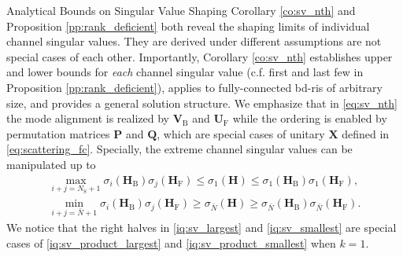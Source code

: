 \documentclass[journal]{IEEEtran}
\begin{document}
\begin{section}{Analytical Bounds on Singular Value Shaping}
		Corollary \ref{co:sv_nth} and Proposition \ref{pp:rank_deficient} both reveal the shaping limits of individual channel singular values.
		They are derived under different assumptions are not special cases of each other.
		Importantly, Corollary \ref{co:sv_nth} establishes upper and lower bounds for \emph{each} channel singular value (c.f. first and last few in Proposition \ref{pp:rank_deficient}), applies to fully-connected \gls{bd}-\gls{ris} of arbitrary size, and provides a general solution structure.
		We emphasize that in \eqref{eq:sv_nth} the mode alignment is realized by $\mathbf{V}_\mathrm{B}$ and $\mathbf{U}_\mathrm{F}$ while the ordering is enabled by permutation matrices $\mathbf{P}$ and $\mathbf{Q}$, which are special cases of unitary $\mathbf{X}$ defined in \eqref{eq:scattering_fc}.
		Specially, the extreme channel singular values can be manipulated up to
		\begin{subequations}
			\label{iq:sv_extreme}
			\begin{gather}
				\max_{i+j=N_\mathrm{S}+1} \sigma_i(\mathbf{H}_\mathrm{B}) \sigma_j(\mathbf{H}_\mathrm{F}) {\le} \sigma_1(\mathbf{H}) {\le} \sigma_1(\mathbf{H}_\mathrm{B}) \sigma_1(\mathbf{H}_\mathrm{F}), \label{iq:sv_largest} \\
				\min_{i+j=\bar{N}+1} \sigma_i(\mathbf{H}_\mathrm{B}) \sigma_j(\mathbf{H}_\mathrm{F}) {\ge} \sigma_{\bar{N}}(\mathbf{H}) {\ge} \sigma_{\bar{N}}(\mathbf{H}_\mathrm{B}) \sigma_{\bar{N}}(\mathbf{H}_\mathrm{F}). \label{iq:sv_smallest}
			\end{gather}
		\end{subequations}
		We notice that the right halves in \eqref{iq:sv_largest} and \eqref{iq:sv_smallest} are special cases of \eqref{iq:sv_product_largest} and \eqref{iq:sv_product_smallest} when $k=1$.


\end{section}
\end{document}
